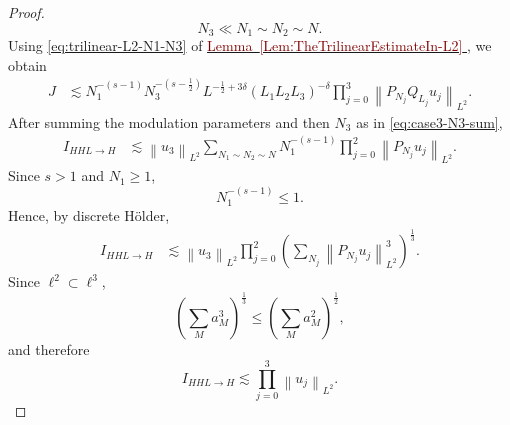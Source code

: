 \documentclass[12pt,oneside,reqno]{amsart}
\newcommand{\lemref}[1]{%
    \hyperref[#1]{%
        \textcolor{Maroon}{Lemma~\ref*{#1}}%
    }%
}
\numberwithin{equation}{section}
\theoremstyle{plain}
\newcommand{\Lpn}[2]{%
    \left\lVert #1\right\rVert_{L^{#2}}%
}
\newcommand{\Ifr}[4]{%
    I_{{#1}{#2}{#3}\to{#4}}%
}
\begin{document}
\begin{proof}
\begin{equation}
    N_3\ll N_1\sim N_2\sim N.
\end{equation}
Using \eqref{eq:trilinear-L2-N1-N3} of
\lemref{Lem:TheTrilinearEstimateIn-L2}, we obtain
\begin{align}
J
&\lesssim
N_1^{-(s-1)}
N_3^{-(s-\frac12)}
L^{-\frac12+3\delta}
(L_1L_2L_3)^{-\delta}
\prod_{j=0}^3
\Lpn{P_{N_j}Q_{L_j}u_j}{2}.
\label{eq:case4-dyadic}
\end{align}
After summing the modulation parameters and then $N_3$ as in
\eqref{eq:case3-N3-sum},
\begin{align}
\Ifr{H}{H}{L}{H}
&\lesssim
\Lpn{u_3}{2}
\sum_{N_1\sim N_2\sim N}
N_1^{-(s-1)}
\prod_{j=0}^2
\Lpn{P_{N_j}u_j}{2}.
\end{align}
Since $s>1$ and $N_1\geq1$,
\begin{equation}
    N_1^{-(s-1)}
    \leq1.
\end{equation}
Hence, by discrete H\"older,
\begin{align}
\Ifr{H}{H}{L}{H}
&\lesssim
\Lpn{u_3}{2}
\prod_{j=0}^2
\left(
    \sum_{N_j}
    \Lpn{P_{N_j}u_j}{2}^3
\right)^{\frac13}.
\end{align}
Since $\ell^2\subset\ell^3$,
\begin{equation}
    \left(
        \sum_M a_M^3
    \right)^{\frac13}
    \leq
    \left(
        \sum_M a_M^2
    \right)^{\frac12},
\end{equation}
and therefore
\begin{equation}
\label{eq:case4-final}
    \Ifr{H}{H}{L}{H}
    \lesssim
    \prod_{j=0}^3
    \Lpn{u_j}{2}.
\end{equation}


\end{proof}
\end{document}
